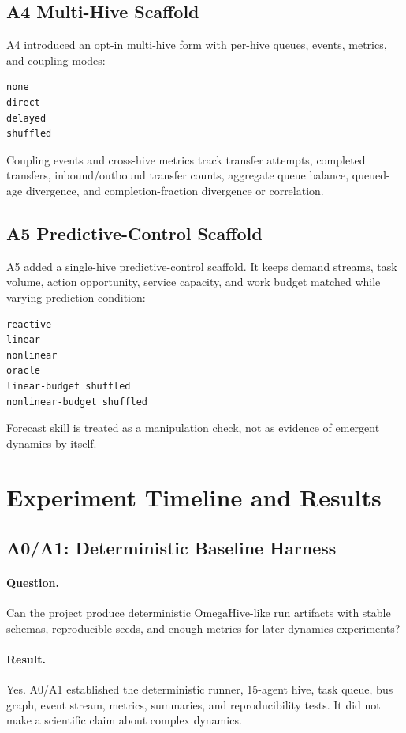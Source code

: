 \documentclass[11pt]{article}
\begin{document}
\subsection{A4 Multi-Hive Scaffold}

A4 introduced an opt-in multi-hive form with per-hive queues, events, metrics,
and coupling modes:

\begin{verbatim}
none
direct
delayed
shuffled
\end{verbatim}

Coupling events and cross-hive metrics track transfer attempts, completed
transfers, inbound/outbound transfer counts, aggregate queue balance,
queued-age divergence, and completion-fraction divergence or correlation.

\subsection{A5 Predictive-Control Scaffold}

A5 added a single-hive predictive-control scaffold. It keeps demand streams,
task volume, action opportunity, service capacity, and work budget matched
while varying prediction condition:

\begin{verbatim}
reactive
linear
nonlinear
oracle
linear-budget shuffled
nonlinear-budget shuffled
\end{verbatim}

Forecast skill is treated as a manipulation check, not as evidence of emergent
dynamics by itself.

\section{Experiment Timeline and Results}

\subsection{A0/A1: Deterministic Baseline Harness}

\paragraph{Question.}
Can the project produce deterministic OmegaHive-like run artifacts with stable
schemas, reproducible seeds, and enough metrics for later dynamics experiments?

\paragraph{Result.}
Yes. A0/A1 established the deterministic runner, 15-agent hive, task queue, bus
graph, event stream, metrics, summaries, and reproducibility tests. It did not
make a scientific claim about complex dynamics.
\end{document}
